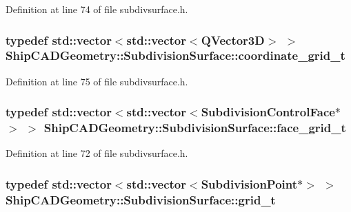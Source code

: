 Definition at line 74 of file subdivsurface.\-h.

\hypertarget{classShipCADGeometry_1_1SubdivisionSurface_a89a36532eb6c7c2022258f8605fe929c}{
\subsubsection[{coordinate\-\_\-grid\-\_\-t}]{\setlength{\rightskip}{0pt plus 5cm}typedef std\-::vector$<$std\-::vector$<$Q\-Vector3\-D$>$ $>$ {\bf Ship\-C\-A\-D\-Geometry\-::\-Subdivision\-Surface\-::coordinate\-\_\-grid\-\_\-t}}}\label{classShipCADGeometry_1_1SubdivisionSurface_a89a36532eb6c7c2022258f8605fe929c}


Definition at line 75 of file subdivsurface.\-h.

\hypertarget{classShipCADGeometry_1_1SubdivisionSurface_a9059895d23b9715aac304d3fecca12fb}{
\subsubsection[{face\-\_\-grid\-\_\-t}]{\setlength{\rightskip}{0pt plus 5cm}typedef std\-::vector$<$std\-::vector$<${\bf Subdivision\-Control\-Face}$\ast$$>$ $>$ {\bf Ship\-C\-A\-D\-Geometry\-::\-Subdivision\-Surface\-::face\-\_\-grid\-\_\-t}}}\label{classShipCADGeometry_1_1SubdivisionSurface_a9059895d23b9715aac304d3fecca12fb}


Definition at line 72 of file subdivsurface.\-h.

\hypertarget{classShipCADGeometry_1_1SubdivisionSurface_a360ddace48a5d6827e99a21e78a6c458}{
\subsubsection[{grid\-\_\-t}]{\setlength{\rightskip}{0pt plus 5cm}typedef std\-::vector$<$std\-::vector$<${\bf Subdivision\-Point}$\ast$$>$ $>$ {\bf Ship\-C\-A\-D\-Geometry\-::\-Subdivision\-Surface\-::grid\-\_\-t}}}\label{classShipCADGeometry_1_1SubdivisionSurface_a360ddace48a5d6827e99a21e78a6c458}


